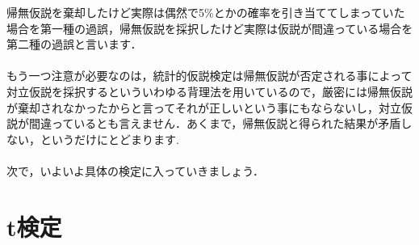 \documentclass[11pt,a4paper,uplatex]{ujreport} 	%
\begin{document}
帰無仮説を棄却したけど実際は偶然で5\%とかの確率を引き当ててしまっていた場合を第一種の過誤，帰無仮説を採択したけど実際は仮説が間違っている場合を第二種の過誤と言います．\\
\\

もう一つ注意が必要なのは，統計的仮説検定は帰無仮説が否定される事によって対立仮説を採択するといういわゆる背理法を用いているので，厳密には帰無仮説が棄却されなかったからと言ってそれが正しいという事にもならないし，対立仮説が間違っているとも言えません．あくまで，帰無仮説と得られた結果が矛盾しない，というだけにとどまります. \\\\

次で，いよいよ具体の検定に入っていきましょう．

\section{t検定}
\end{document}
